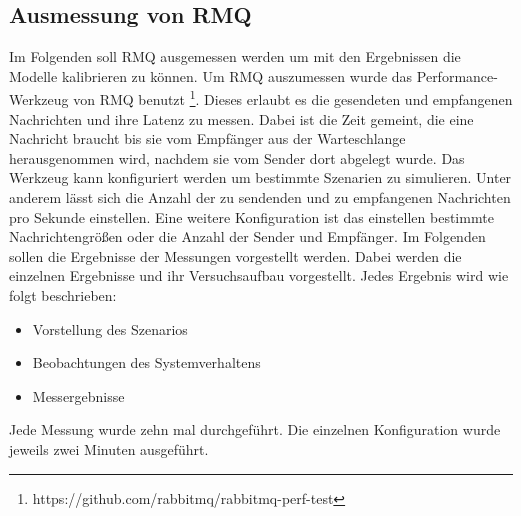 \subsection{Ausmessung von RMQ}
\label{sec:rmqBenchmark}
Im Folgenden soll RMQ ausgemessen werden um mit den Ergebnissen die Modelle kalibrieren zu können. Um RMQ auszumessen wurde das Performance-Werkzeug von RMQ benutzt \footnote{https://github.com/rabbitmq/rabbitmq-perf-test}. Dieses erlaubt es die gesendeten und empfangenen Nachrichten und ihre Latenz zu messen. Dabei ist die Zeit gemeint, die eine Nachricht braucht bis sie vom Empfänger aus der Warteschlange herausgenommen wird, nachdem sie vom Sender dort abgelegt wurde. Das Werkzeug kann konfiguriert werden um bestimmte Szenarien zu simulieren. Unter anderem lässt sich die Anzahl der zu sendenden und zu empfangenen Nachrichten pro Sekunde einstellen. Eine weitere Konfiguration ist das einstellen bestimmte Nachrichtengrößen oder die Anzahl der Sender und Empfänger. Im Folgenden sollen die Ergebnisse der Messungen vorgestellt werden. Dabei werden die einzelnen Ergebnisse und ihr Versuchsaufbau vorgestellt. Jedes Ergebnis wird wie folgt beschrieben: 
\begin{itemize}
    \item Vorstellung des Szenarios
    \item Beobachtungen des Systemverhaltens
    \item Messergebnisse
\end{itemize}
Jede Messung wurde zehn mal durchgeführt. Die einzelnen Konfiguration wurde jeweils zwei Minuten ausgeführt. 



